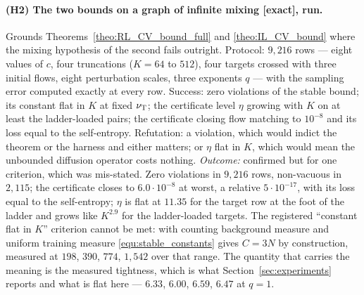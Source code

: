 \paragraph{(H2) The two bounds on a graph of infinite mixing [exact], run.}
Grounds Theorems~\ref{theo:RL_CV_bound_full} and \ref{theo:IL_CV_bound} where the mixing
hypothesis of the second fails outright. Protocol: $9{,}216$ rows --- eight values of $c$, four
truncations ($K=64$ to $512$), four targets crossed with three initial flows, eight
perturbation scales, three exponents $q$ --- with the sampling error computed exactly at every
row. Success: zero violations of the stable bound; its constant flat in $K$ at fixed
$\nu_{\mathrm{T}}$; the certificate level $\eta$ growing with $K$ on at least the ladder-loaded pairs;
the certificate closing flow matching to $10^{-8}$ and its loss equal to the self-entropy.
Refutation: a violation, which would indict the theorem or the harness and either matters; or
$\eta$ flat in $K$, which would mean the unbounded diffusion operator costs nothing.
\emph{Outcome:} confirmed but for one criterion, which was mis-stated. Zero violations in
$9{,}216$ rows, non-vacuous in $2{,}115$; the certificate closes to $6.0\cdot10^{-8}$ at worst,
a relative $5\cdot10^{-17}$, with its loss equal to the self-entropy; $\eta$ is flat at $11.35$
for the target row at the foot of the ladder and grows like $K^{2.9}$ for the ladder-loaded
targets. The registered ``constant flat in $K$'' criterion cannot be met: with counting
background measure and uniform training measure \eqref{equ:stable_constants} gives $C=3N$ by
construction, measured at $198$, $390$, $774$, $1{,}542$ over that range. The quantity that
carries the meaning is the measured tightness, which is what Section~\ref{sec:experiments}
reports and what is flat here --- $6.33$, $6.00$, $6.59$, $6.47$ at $q=1$.

